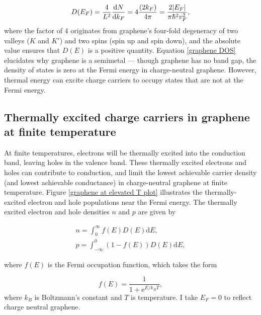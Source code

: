 \documentclass[double,12pt,1in]{beavtex}
\begin{document}
\begin{equation}
    D(E_F) = \frac{4}{L^2} \derivative{N}{k_F} = 4\frac{(2k_F)}{4 \pi} = \frac{2\abs{E_F}}{\pi \hbar^2 v_F^2}, \label{graphene DOS}
\end{equation}
where the factor of 4 originates from graphene's four-fold degeneracy of two valleys ($K$ and $K'$) and two spins (spin up and spin down), and the absolute value ensures that $D(E)$ is a positive quantity. Equation \ref{graphene DOS} elucidates why graphene is a semimetal — though graphene has no band gap, the density of states is zero at the Fermi energy in charge-neutral graphene. However, thermal energy can excite charge carriers to occupy states that are not at the Fermi energy.

\subsection{Thermally excited charge carriers in graphene at finite temperature}
At finite temperatures, electrons will be thermally excited into the conduction band, leaving holes in the valence band. These thermally excited electrons and holes can contribute to conduction, and limit the lowest achievable carrier density (and lowest achievable conductance) in charge-neutral graphene at finite temperature. Figure \ref{graphene at elevated T plot} illustrates the thermally-excited electron and hole populations near the Fermi energy. The thermally excited electron and hole densities $n$ and $p$ are given by

\begin{gather}
        n = \int_{0}^{\infty}f(E) D(E)\mathrm{d}E, \label{n integral} \\ 
        p = \int_{-\infty}^{0}(1- f(E)) D(E)\mathrm{d}E, \label{p integral}
\end{gather}

where $f(E)$ is the Fermi occupation function, which takes the form

\begin{equation}
    f(E) = \frac{1}{1+\mathrm{e}^{E/k_B T}},
\end{equation}
where $k_B$ is Boltzmann's constant and $T$ is temperature. I take $E_F = 0$ to reflect charge neutral graphene. 
\end{document}
